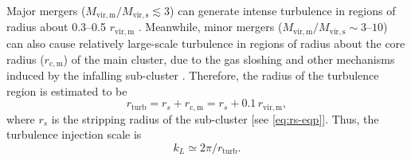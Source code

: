 \documentclass[twocolumn]{aastex62}
\newcommand{\R}[1]{\mathrm{#1}}
\newcommand{\editone}[1]{{\leavevmode\color{cyan}#1}}
\begin{document}
\editone{%
Major mergers ($M_{\R{vir,m}} / M_{\R{vir,s}} \lesssim 3$) can generate
intense turbulence in regions of radius about \numrange{0.3}{0.5}
$r_{\R{vir,m}}$ \citep[e.g.,][]{sunyaev2003,miniati2015ss}.
Meanwhile, minor mergers
($M_{\R{vir,m}} / M_{\R{vir,s}} \sim \numrange{3}{10}$) can also cause
relatively large-scale turbulence in regions of radius about the core
radius ($r_{\R{c,m}}$) of the main cluster, due to the gas sloshing and
other mechanisms induced by the infalling sub-cluster
\citep[e.g.,][]{vazza2011,vazza2012}.
Therefore, the radius of the turbulence region is estimated to be
\begin{equation}
  \label{eq:radius-turb}
  r_{\R{turb}} = r_s + r_{\R{c,m}} = r_s + 0.1 \,r_{\R{vir,m}},
\end{equation}
where $r_s$ is the stripping radius of the sub-cluster
[see \autoref{eq:rs-eqp}].
Thus, the turbulence injection scale is
\begin{equation}
  \label{eq:injection-scale}
  k_L \simeq 2\pi / r_{\R{turb}} .
\end{equation}

}
\end{document}
